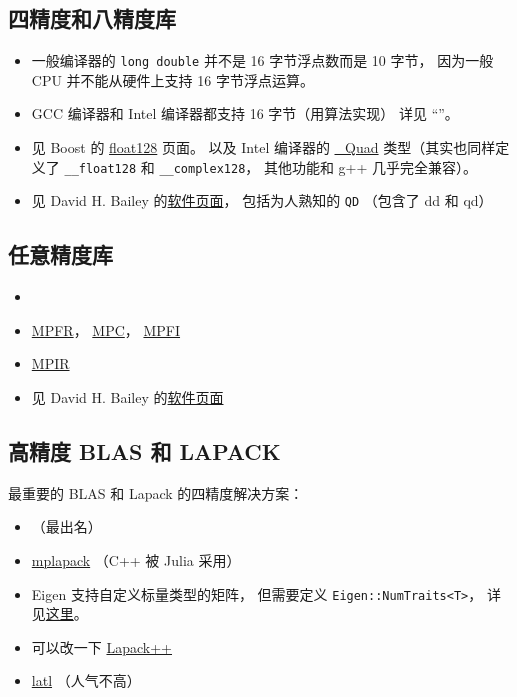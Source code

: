 
\begin{issues}
\issueDraft
\end{issues}

\subsection{四精度和八精度库}
\begin{itemize}
\item 一般编译器的 \verb`long double` 并不是 16 字节浮点数而是 10 字节， 因为一般 CPU 并不能从硬件上支持 16 字节浮点运算。
\item GCC 编译器和 Intel 编译器都支持 16 字节（用算法实现） 详见 “”。
\item 见 Boost 的 \href{https://www.boost.org/doc/libs/develop/libs/multiprecision/doc/html/boost_multiprecision/tut/floats/float128.html}{float128} 页面。 以及 Intel 编译器的 \href{https://community.intel.com/t5/Intel-C-Compiler/Quad-precision-Quad-data-type/td-p/1218636}{\_Quad} 类型（其实也同样定义了 \verb`__float128` 和 \verb`__complex128`， 其他功能和 g++ 几乎完全兼容）。
\item 见 David H. Bailey 的\href{https://www.davidhbailey.com/dhbsoftware/}{软件页面}， 包括为人熟知的 \verb`QD` （包含了 dd 和 qd）
\end{itemize}

\subsection{任意精度库}
\begin{itemize}
\item {}
\item \href{https://www.mpfr.org/}{MPFR}， \href{https://www.multiprecision.org/mpc/}{MPC}， \href{http://perso.ens-lyon.fr/nathalie.revol/software.html}{MPFI}
\item \href{https://mpir.org/downloads.html}{MPIR}
\item 见 David H. Bailey 的\href{https://www.davidhbailey.com/dhbsoftware/}{软件页面}
\end{itemize}


\subsection{高精度 BLAS 和 LAPACK}
最重要的 BLAS 和 Lapack 的四精度解决方案：
\begin{itemize}
\item {} （最出名）
\item \href{https://github.com/nakatamaho/mplapack}{mplapack} （C++ 被 Julia 采用）
\item Eigen 支持自定义标量类型的矩阵， 但需要定义 \verb`Eigen::NumTraits<T>`， 详见\href{https://eigen.tuxfamily.org/dox/TopicCustomizing_CustomScalar.html}{这里}。
\item 可以改一下 \href{https://lapackpp.sourceforge.net/html/index.html}{Lapack++}
\item \href{https://github.com/langou/latl}{latl} （人气不高）
\end{itemize}
